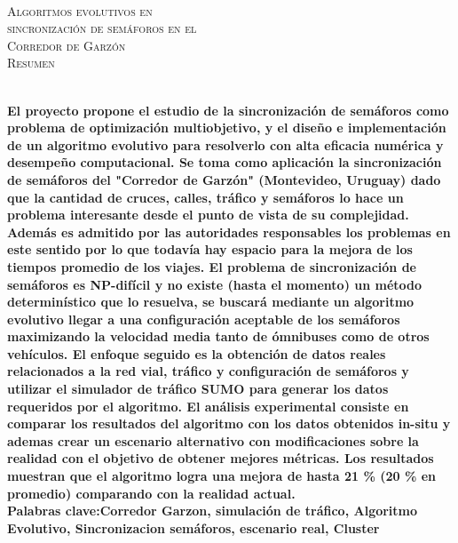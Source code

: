 {
\thispagestyle{empty}
~\\[0.2cm]
\begin{center}
    \textsc{\huge Algoritmos evolutivos en  } \\[0.2cm] 
    \textsc{\huge sincronización de semáforos en el  } \\[0.2cm]         
    \textsc{\huge Corredor de Garzón} \\[1cm]
    \textsc{\Large Resumen}
\end{center}
~\\[0.2cm]
\textbf{\large 
El proyecto propone el estudio de la sincronización de semáforos como problema de optimización multiobjetivo, y el diseño e implementación de un algoritmo evolutivo para resolverlo con alta eficacia numérica y desempeño computacional. \newline \newline
Se toma como aplicación la sincronización de semáforos del "Corredor de Garzón" (Montevideo, Uruguay) dado que la cantidad de cruces, calles, tráfico y semáforos lo hace un problema interesante desde el punto de vista de su complejidad. Además es admitido por las autoridades responsables los problemas en este sentido por lo que todavía hay espacio para la mejora de los tiempos promedio de los viajes.  \newline \newline
El problema de sincronización de semáforos es NP-difícil y no existe (hasta el momento) un método determinístico que lo resuelva, se buscará mediante un algoritmo evolutivo llegar a una configuración aceptable de los semáforos maximizando la velocidad media tanto de ómnibuses como de otros vehículos.
El enfoque seguido es la obtención de datos reales relacionados a la red vial, tráfico y configuración de semáforos y utilizar el simulador de tráfico SUMO para generar los datos requeridos por el algoritmo.
El análisis experimental consiste en comparar los resultados del algoritmo con los datos obtenidos in-situ y ademas crear un escenario alternativo con modificaciones sobre la realidad con el objetivo de obtener mejores métricas. Los resultados muestran que el algoritmo logra una mejora de hasta  21 \% (20 \% en promedio)  comparando con la realidad actual.
 } 	
	~\\[1.0cm]
    \textbf{\large Palabras clave:Corredor Garzon, simulación de tráfico,  Algoritmo Evolutivo, Sincronizacion semáforos, escenario real, Cluster}

}
\cleardoublepage

